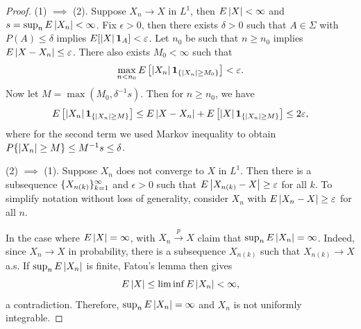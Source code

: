\documentclass[a4paper]{article}
\newcommand{\convp}{\xrightarrow{p}}
\begin{document}
\begin{proof}
  (1) $\implies$ (2). Suppose $X_n \to X$ in $L^1$, then $E \left\lvert X\right\rvert < \infty$
  and $s = \sup_n E \left\lvert X_n\right\rvert < \infty$. Fix $\epsilon > 0$, then
  there exists $\delta > 0$ such that $A \in \Sigma$
  with $P (A) \leq \delta$ implies $E [\left\lvert X\right\rvert \operatorname{\mathbf{1}}_A] < \varepsilon$.
  Let $n_0$ be such that $n \geq n_0$ implies
  $E \left\lvert X - X_n\right\rvert \leq \varepsilon$. There also exists $M_0 < \infty$
  such that
  \[
    \max_{n < n_0} E \left[ \left\lvert X_n\right\rvert \operatorname{\mathbf{1}}_{\{\left\lvert X_n\right\rvert \geq M_0 \}} \right]
    < \varepsilon.
  \]
  Now let $M = \max (M_0, \delta^{-1} s)$. Then for $n \geq n_0$,
  we have
  \begin{align*}
    E \left[ \left\lvert X_n\right\rvert \operatorname{\mathbf{1}}_{\{\left\lvert X_n\right\rvert \geq M\}} \right]
    \leq E \left\lvert X - X_n\right\rvert + E \left[ \left\lvert X\right\rvert \operatorname{\mathbf{1}}_{\{\left\lvert X_n\right\rvert \geq M\}} \right]
    \leq 2 \varepsilon,
  \end{align*}
  where for the second term we used Markov inequality
  to obtain $P \{\left\lvert X_n\right\rvert \geq M\} \leq M^{-1} s \leq \delta$.

  (2) $\implies$ (1). Suppose $X_n$ does not converge to $X$
  in $L^1$. Then there is a subsequence $\{ X_{n(k)} \}_{k=1}^\infty$ and
  $\epsilon > 0$ such that $E \left\lvert X_{n(k)} - X\right\rvert \geq \varepsilon$ for
  all $k$. To simplify notation without loss of generality,
  consider $X_n$ with $E \left\lvert X_n - X\right\rvert \geq \varepsilon$ for all $n$.

  In the case where $E \left\lvert X\right\rvert = \infty$, with $X_n \convp X$
  claim that $\sup_n E \left\lvert X_n\right\rvert = \infty$. Indeed,
  since $X_n \to X$ in probability, there is a subsequence $X_{n(k)}$
  such that $X_{n(k)} \to X$ a.s. If $\sup_n E \left\lvert X_n\right\rvert$
  is finite, Fatou's lemma then gives
  \[
    E \left\lvert X\right\rvert \leq \liminf E \left\lvert X_n\right\rvert < \infty,
  \]
  a contradiction. Therefore, $\sup_n E \left\lvert X_n\right\rvert = \infty$
  and $X_n$ is not uniformly integrable.


\end{proof}
\end{document}
